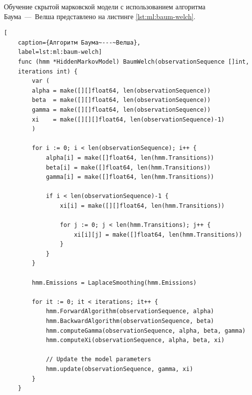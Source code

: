 Обучение скрытой марковской модели с использованием алгоритма Баума~---~Велша представлено на листинге \ref{lst:ml:baum-welch}.
\begin{lstlisting}[
	caption={Алгоритм Баума~---~Велша},
	label=lst:ml:baum-welch]
	func (hmm *HiddenMarkovModel) BaumWelch(observationSequence []int,
	iterations int) {
		var (
		alpha = make([][]float64, len(observationSequence))
		beta  = make([][]float64, len(observationSequence))
		gamma = make([][]float64, len(observationSequence))
		xi    = make([][][]float64, len(observationSequence)-1)
		)
		
		for i := 0; i < len(observationSequence); i++ {
			alpha[i] = make([]float64, len(hmm.Transitions))
			beta[i] = make([]float64, len(hmm.Transitions))
			gamma[i] = make([]float64, len(hmm.Transitions))
			
			if i < len(observationSequence)-1 {
				xi[i] = make([][]float64, len(hmm.Transitions))
				
				for j := 0; j < len(hmm.Transitions); j++ {
					xi[i][j] = make([]float64, len(hmm.Transitions))
				}
			}
		}
		
		hmm.Emissions = LaplaceSmoothing(hmm.Emissions)
		
		for it := 0; it < iterations; it++ {
			hmm.ForwardAlgorithm(observationSequence, alpha)
			hmm.BackwardAlgorithm(observationSequence, beta)
			hmm.computeGamma(observationSequence, alpha, beta, gamma)
			hmm.computeXi(observationSequence, alpha, beta, xi)
			
			// Update the model parameters
			hmm.update(observationSequence, gamma, xi)
		}
	}
\end{lstlisting}

